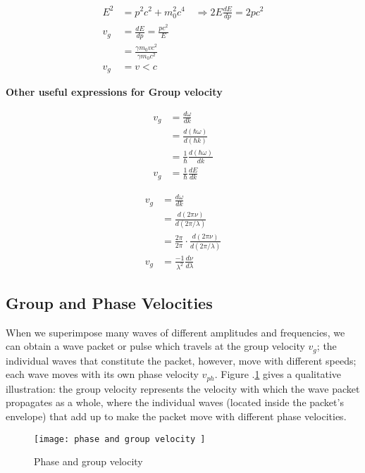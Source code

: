 \begin{align}
E^{2}&=p^{2} c^{2}+m_{0}^{2} c^{4} \quad \Rightarrow 2 E \frac{d E}{d p}=2 p c^{2} \\
v_{g}&=\frac{d E}{d p}=\frac{p c^{2}}{E}\\&=\frac{\gamma m_{0} v c^{2}}{\gamma m_{0} c^{2}}\\v_{g}&=v <c
\end{align}
\begin{center}
\end{center}
\begin{note} \hspace{0.6cm}
	\textbf{\large Other useful expressions for Group velocity}\\
	\begin{minipage}{0.30\textwidth}
		\begin{align*}
		v_{g}&=\frac{d\omega}{dk}\\
		&=\frac{d (\hbar\omega)}{d (\hbar k) }\\
		&= \frac{1}{ \hbar }\frac{d (\hbar\omega)}{dk}\\
		v_{g}&= \frac{1}{ \hbar }\frac{d E}{d   k}
		\end{align*}
	\end{minipage}
	\begin{minipage}{0.30\textwidth}
		\begin{align*}
		v_{g}&=\frac{d\omega}{dk}\\
		&=\frac{d (2 \pi \nu)}{d (2\pi/\lambda) }\\
		&= \frac{ 2 \pi }{ 2\pi }\cdot \frac{d (2 \pi \nu)}{d (2\pi/\lambda) }\\
		v_{g}&= \frac{-1}{ \lambda^{2} }\frac{d \nu}{d \lambda}
		\end{align*}
	\end{minipage}
\end{note}
\subsection{Group and Phase Velocities}

When we superimpose many waves of different amplitudes and frequencies, we can obtain a wave packet or pulse which travels at the group velocity $v_{g}$; the individual waves that constitute the packet, however, move with different speeds; each wave moves with its own phase velocity $v_{p h}$. Figure .\ref{phase and group velocity} gives a qualitative illustration: the group velocity represents the velocity with
which the wave packet propagates as a whole, where the individual waves (located inside the
packet’s envelope) that add up to make the packet move with different phase velocities.
\begin{figure}[H]
	\centering
	\texttt{[image: phase and group velocity ]}
	\caption{Phase and group velocity}
	\label{phase and group velocity}
\end{figure}
